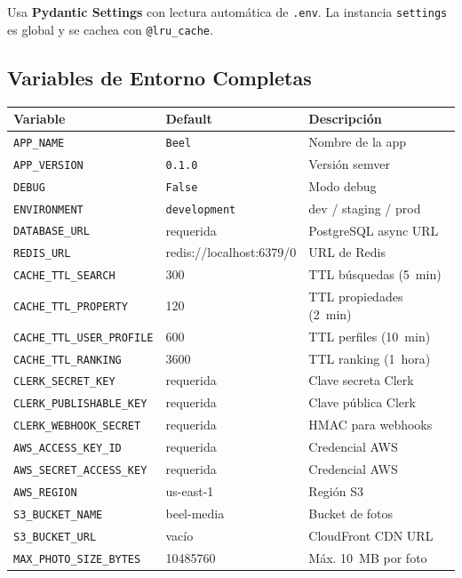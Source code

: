 \documentclass[12pt,a4paper]{report}
\begin{document}
Usa \textbf{Pydantic Settings} con lectura autom\'atica de \texttt{.env}.
La instancia \texttt{settings} es global y se cachea con \texttt{@lru\_cache}.

\subsection{Variables de Entorno Completas}

\begin{longtable}{L{5.5cm} L{3.5cm} L{3.5cm}}
\toprule
\textbf{Variable} & \textbf{Default} & \textbf{Descripci\'on} \\
\midrule
\endhead
\texttt{APP\_NAME} & \texttt{Beel} & Nombre de la app \\
\texttt{APP\_VERSION} & \texttt{0.1.0} & Versi\'on semver \\
\texttt{DEBUG} & \texttt{False} & Modo debug \\
\texttt{ENVIRONMENT} & \texttt{development} & dev / staging / prod \\
\texttt{DATABASE\_URL} & requerida & PostgreSQL async URL \\
\texttt{REDIS\_URL} & redis://localhost:6379/0 & URL de Redis \\
\texttt{CACHE\_TTL\_SEARCH} & 300 & TTL b\'usquedas (5~min) \\
\texttt{CACHE\_TTL\_PROPERTY} & 120 & TTL propiedades (2~min) \\
\texttt{CACHE\_TTL\_USER\_PROFILE} & 600 & TTL perfiles (10~min) \\
\texttt{CACHE\_TTL\_RANKING} & 3600 & TTL ranking (1~hora) \\
\texttt{CLERK\_SECRET\_KEY} & requerida & Clave secreta Clerk \\
\texttt{CLERK\_PUBLISHABLE\_KEY} & requerida & Clave p\'ublica Clerk \\
\texttt{CLERK\_WEBHOOK\_SECRET} & requerida & HMAC para webhooks \\
\texttt{AWS\_ACCESS\_KEY\_ID} & requerida & Credencial AWS \\
\texttt{AWS\_SECRET\_ACCESS\_KEY} & requerida & Credencial AWS \\
\texttt{AWS\_REGION} & us-east-1 & Regi\'on S3 \\
\texttt{S3\_BUCKET\_NAME} & beel-media & Bucket de fotos \\
\texttt{S3\_BUCKET\_URL} & vac\'io & CloudFront CDN URL \\
\texttt{MAX\_PHOTO\_SIZE\_BYTES} & 10485760 & M\'ax. 10~MB por foto \\

\end{longtable}
\end{document}
